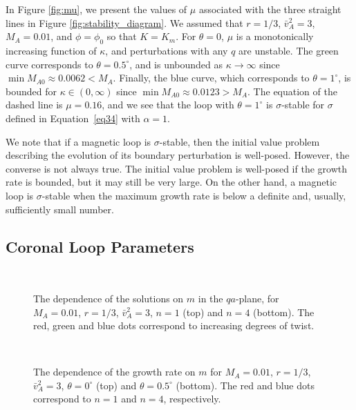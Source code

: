 In Figure \ref{fig:mu}, we present the values of $\mu$ associated with the three straight lines in Figure \ref{fig:stability_diagram}.
We assumed that $r = 1/3$, $\bar v_A^2 = 3$, $M_A = 0.01$, and $\phi = \phi_0$ so that $K = K_m$\/.
For $\theta = 0$, $\mu$ is a monotonically increasing function of $\kappa$, and perturbations with any $q$ are unstable.
The green curve corresponds to $\theta = 0.5^\circ$, and is unbounded as $\kappa \to \infty$ since $\min M_{A0} \approx 0.0062 < M_A$.
Finally, the blue curve, which corresponds to $\theta = 1^\circ$, is bounded for $\kappa \in (0,\infty)$ since $\min M_{A0} \approx 0.0123 > M_A$.
The equation of the dashed line is $\mu = 0.16$, and we see that the loop with $\theta = 1^\circ$ is $\sigma$-stable for $\sigma$ defined in Equation~\eqref{eq34} with $\alpha = 1$.

We note that if a magnetic loop is $\sigma$-stable, then the initial value problem describing the evolution of its boundary perturbation is well-posed.
However, the converse is not always true.
The initial value problem is well-posed if the growth rate is bounded, but it may still be very large.
On the other hand, a magnetic loop is $\sigma$-stable when the maximum growth rate is below a definite and, usually, sufficiently small number.

\subsection{Coronal Loop Parameters}
\label{subsec:loop}

\begin{figure}[!ht]
\centering
{}
\\
\caption{
The dependence of the solutions on $m$ in the $qa$-plane, for $M_A = 0.01$, $r = 1/3$, 
$\bar{v}_A^2 = 3$, $n=1$ (top) and $n=4$ (bottom).
The red, green and blue dots correspond to increasing degrees of twist.
}
\label{fig:stability_loop}
\end{figure}

\begin{figure}[!ht]
\centering
\subfloat[$\theta=0^\circ$]
{\texttt{[image: figures/loop\_tilt\_growth\_theta=0.png]}}
\\
\subfloat[$\theta=0.5^\circ$]
{\texttt{[image: figures/loop\_tilt\_growth\_theta=05.png]}}
\caption{
The dependence of the growth rate on $m$ for $M_A = 0.01$, $r = 1/3$, 
$\bar{v}_A^2 = 3$, $\theta=0^\circ$ (top) and $\theta=0.5^\circ$ (bottom).
The red and blue dots correspond to $n=1$ and $n=4$, respectively.
}
\label{fig:growth_loop}
\end{figure}

